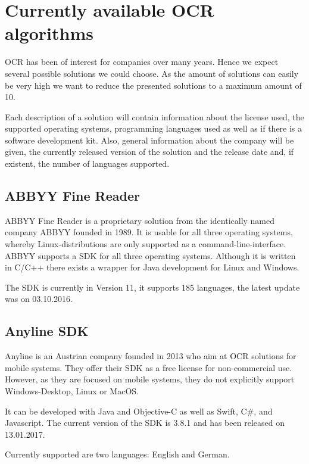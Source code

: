 \section{Currently available OCR algorithms}
\label{sec3.1}

OCR has been of interest for companies over many years. Hence we expect several possible solutions we could choose. As the amount of solutions can easily be very high we want to reduce the presented solutions to a maximum amount of 10.

Each description of a solution will contain information about the license used, the supported operating systems, programming languages used as well as if there is a software development kit. Also, general information about the company will be given, the currently released version of the solution and the release date and, if existent, the number of languages supported.

\subsection{ABBYY Fine Reader}
\label{sec3.1.1}

ABBYY Fine Reader is a proprietary solution from the identically named company ABBYY founded in 1989. It is usable for all three operating systems, whereby Linux-distributions are only supported as a command-line-interface. ABBYY supports a SDK for all three operating systems. Although it is written in C/C++ there exists a wrapper for Java development for Linux and Windows\cite{abbyy16}. 

The SDK is currently in Version 11, it supports 185 languages, the latest update was on 03.10.2016.

\subsection{Anyline SDK}
\label{sec3.1.2}

Anyline is an Austrian company founded in 2013 who aim at OCR solutions for mobile systems. They offer their SDK as a free license for non-commercial use. However, as they are focused on mobile systems, they do not explicitly support Windows-Desktop, Linux or MacOS.

It can be developed with Java and Objective-C as well as Swift, C\#, and Javascript. The current version of the SDK is 3.8.1 and has been released on 13.01.2017.

Currently supported are two languages: English and German.

